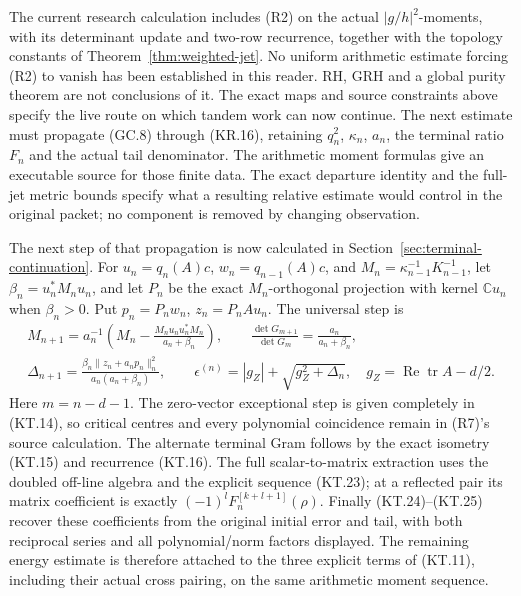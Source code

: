 The current research calculation includes (R2) on the actual
\(|g/h|^2\)-moments, with its determinant update and two-row
recurrence, together with the topology constants of
Theorem~\ref{thm:weighted-jet}. No uniform arithmetic estimate
forcing (R2) to vanish has been established in this reader.
RH, GRH and a global purity theorem are not conclusions of it.
The exact maps and source constraints above specify the live
route on which tandem work can now continue.
The next estimate must propagate (GC.8) through (KR.16), retaining
\(q_n^2\), \(\kappa_n\), \(a_n\), the terminal ratio \(F_n\)
and the actual tail denominator. The arithmetic moment formulas
give an executable source for those finite data. The exact
departure identity and the full-jet metric bounds specify what
a resulting relative estimate would control in the original
packet; no component is removed by changing observation.

The next step of that propagation is now calculated in
Section~\ref{sec:terminal-continuation}.  For
\(u_n=q_n(A)c\), \(w_n=q_{n-1}(A)c\), and
\(M_n=\kappa_{n-1}^{-1}K_{n-1}^{-1}\), let
\(\beta_n=u_n^*M_nu_n\), and let \(P_n\) be the exact
\(M_n\)-orthogonal projection with kernel \(\mathbb Cu_n\)
when \(\beta_n>0\).  Put
\(p_n=P_nw_n\), \(z_n=P_nAu_n\).  The universal step is
\[
 \begin{gathered}
 M_{n+1}=a_n^{-1}\left(M_n-
      \frac{M_nu_nu_n^*M_n}{a_n+\beta_n}\right),\qquad
 \frac{\det G_{m+1}}{\det G_m}
             =\frac{a_n}{a_n+\beta_n},\\
 \Delta_{n+1}=
 \frac{\beta_n\|z_n+a_np_n\|_n^2}{a_n(a_n+\beta_n)},\qquad
 \epsilon^{(n)}=|g_Z|+\sqrt{g_Z^2+\Delta_n},\quad
 g_Z=\operatorname{Re}\operatorname{tr}A-d/2.
 \end{gathered}
 \tag{R7}
\]
Here \(m=n-d-1\).  The zero-vector exceptional step is given
completely in (KT.14), so critical centres and every polynomial
coincidence remain in (R7)'s source calculation.  The alternate
terminal Gram follows by the exact isometry (KT.15) and recurrence
(KT.16).  The full scalar-to-matrix extraction uses the doubled
off-line algebra and the explicit sequence (KT.23); at a reflected
pair its matrix coefficient is exactly
\((-1)^lF_n^{[k+l+1]}(\rho)\).  Finally (KT.24)--(KT.25)
recover these coefficients from the original initial error and
tail, with both reciprocal series and all polynomial/norm factors
displayed.  The remaining energy estimate is therefore attached to
the three explicit terms of (KT.11), including their actual cross
pairing, on the same arithmetic moment sequence.

